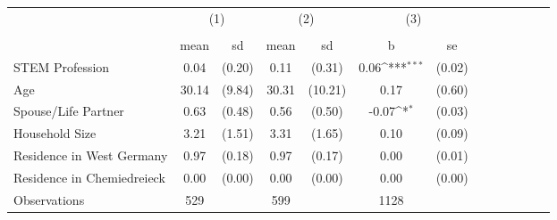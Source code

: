 {
\def\sym#1{\ifmmode^{#1}\else\(^{#1}\)\fi}
\begin{tabular}{l*{3}{cccc}}
\toprule
                    &\multicolumn{2}{c}{(1)}  &\multicolumn{2}{c}{(2)}  &\multicolumn{2}{c}{(3)}           \\
                    &\multicolumn{2}{c}{}     &\multicolumn{2}{c}{}     &\multicolumn{2}{c}{}              \\
                    &        mean&          sd&        mean&          sd&           b         &          se\\
\midrule
STEM Profession     &        0.04&      (0.20)&        0.11&      (0.31)&        0.06\sym{***}&      (0.02)\\
Age                 &       30.14&      (9.84)&       30.31&     (10.21)&        0.17         &      (0.60)\\
Spouse/Life Partner &        0.63&      (0.48)&        0.56&      (0.50)&       -0.07\sym{*}  &      (0.03)\\
Household Size      &        3.21&      (1.51)&        3.31&      (1.65)&        0.10         &      (0.09)\\
Residence in West Germany&        0.97&      (0.18)&        0.97&      (0.17)&        0.00         &      (0.01)\\
Residence in Chemiedreieck&        0.00&      (0.00)&        0.00&      (0.00)&        0.00         &      (0.00)\\
\midrule
Observations        &         529&            &         599&            &        1128         &            \\
\bottomrule
\end{tabular}
}
